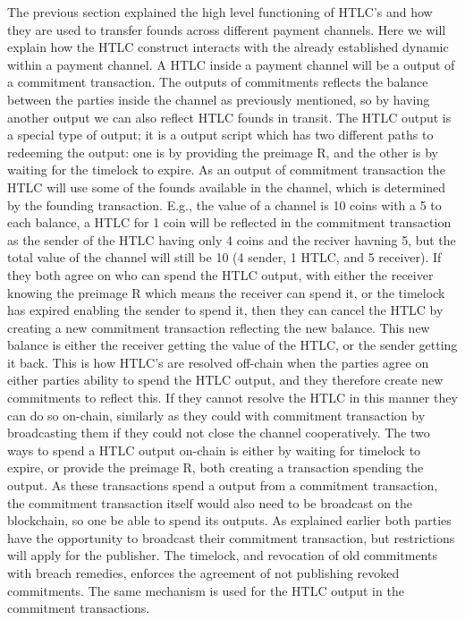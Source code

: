The previous section explained the high level functioning of HTLC's and how they are used to transfer founds across different payment channels.
Here we will explain how the HTLC construct interacts with the already established dynamic within a payment channel.
A HTLC inside a payment channel will be a output of a commitment transaction. The outputs of commitments reflects the balance between the parties inside the channel as previously mentioned, so by having another output we can also reflect HTLC founds in transit. The HTLC output is a special type of output; it is a output script which has two different paths to redeeming the output: one is by providing the preimage R, and the other is by waiting for the timelock to expire. 
As an output of commitment transaction the HTLC will use some of the founds available in the channel, which is determined by the founding transaction. E.g., the value of a channel is 10 coins with a 5 to each balance, a HTLC for 1 coin will be reflected in the commitment transaction as the sender of the HTLC having only 4 coins and the reciver havning 5, but the total value of the channel will still be 10 (4 sender, 1 HTLC, and 5 receiver). If they both agree on who can spend the HTLC output, with either the receiver knowing the preimage R which means the receiver can spend it, or the timelock has expired enabling the sender to spend it, then they can cancel the HTLC by creating a new commitment transaction reflecting the new balance. 
This new balance is either the receiver getting the value of the HTLC, or the sender getting it back. This is how HTLC's are resolved off-chain when the parties agree on either parties ability to spend the HTLC output, and they therefore create new commitments to reflect this. If they cannot resolve the HTLC in this manner they can do so on-chain, similarly as they could with commitment transaction by broadcasting them if they could not close the channel cooperatively. 
The two ways to spend a HTLC output on-chain is either by waiting for timelock to expire, or provide the preimage R, both creating a transaction spending the output. As these transactions spend a output from a commitment transaction, the commitment transaction itself would also need to be broadcast on the blockchain, so one be able to spend its outputs. As explained earlier both parties have the opportunity to broadcast their commitment transaction, but restrictions will apply for the publisher. The timelock, and revocation of old commitments with breach remedies, enforces the agreement of not publishing revoked commitments.
The same mechanism is used for the HTLC output in the commitment transactions. 
\\

